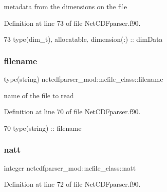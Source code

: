 metadata from the dimensions on the file 



Definition at line 73 of file Net\+C\+D\+Fparser.\+f90.


\begin{DoxyCode}
73         \textcolor{keywordtype}{type}(dim\_t), \textcolor{keywordtype}{allocatable}, \textcolor{keywordtype}{dimension(:)} :: dimData
\end{DoxyCode}
\mbox{\label{structnetcdfparser__mod_1_1ncfile__class_ae3784734e7d33f1c44284a489dc18b8e}} 
\subsubsection{\texorpdfstring{filename}{filename}}
{\footnotesize\ttfamily type(string) netcdfparser\+\_\+mod\+::ncfile\+\_\+class\+::filename\hspace{0.3cm}{\ttfamily [private]}}



name of the file to read 



Definition at line 70 of file Net\+C\+D\+Fparser.\+f90.


\begin{DoxyCode}
70         \textcolor{keywordtype}{type}(string) :: filename
\end{DoxyCode}
\mbox{\label{structnetcdfparser__mod_1_1ncfile__class_a79568f0aae456c7a278c44a767a7be11}} 
\subsubsection{\texorpdfstring{natt}{natt}}
{\footnotesize\ttfamily integer netcdfparser\+\_\+mod\+::ncfile\+\_\+class\+::natt\hspace{0.3cm}{\ttfamily [private]}}



Definition at line 72 of file Net\+C\+D\+Fparser.\+f90.


